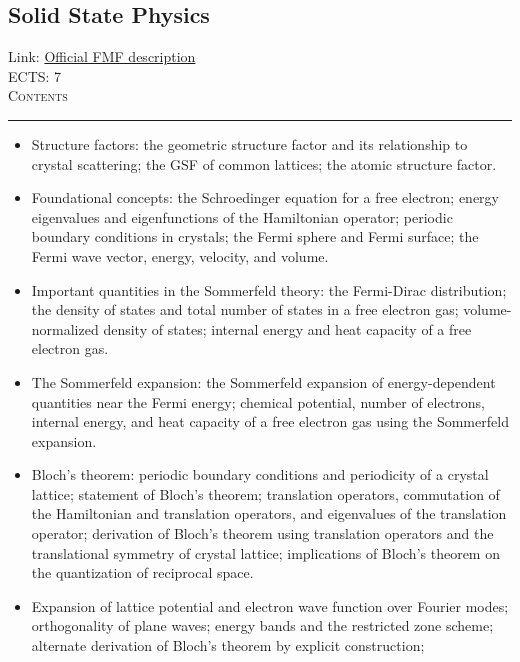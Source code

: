 \documentclass[11pt, a4paper]{article}
\newenvironment{course}[3]{
\subsection{#1}%
Link: \href{#2}{Official FMF description}\\%
ECTS: #3%
\vspace{1ex}
\\
{\large \textsc{Contents}}\\[-0.9ex]%
\rule{\textwidth}{0.5pt}
\vspace{-3ex}
}
{}
\newenvironment{chapter}[1]{
\begin{tcolorbox}[title=#1, breakable]
}
{\end{tcolorbox}}
\begin{document}
\begin{course}{Solid State Physics}{https://www.fmf.uni-lj.si/en/study-physics/programmes/1fiz/2020/7000777/courses/1138/}{7}
\begin{chapter}{Crystal structure}
\begin{itemize}
            \item Structure factors: the geometric structure factor and its relationship to crystal scattering; the GSF of common lattices; the atomic structure factor.

        \end{itemize}
    \end{chapter}

    \begin{chapter}{The Sommerfeld theory of free electrons}
        \begin{itemize}
        
            \item Foundational concepts: the Schroedinger equation for a free electron; energy eigenvalues and eigenfunctions of the Hamiltonian operator; periodic boundary conditions in crystals; the Fermi sphere and Fermi surface; the Fermi wave vector, energy, velocity, and volume.

            \item Important quantities in the Sommerfeld theory: the Fermi-Dirac distribution; the density of states and total number of states in a free electron gas; volume-normalized density of states; internal energy and heat capacity of a free electron gas.

            \item The Sommerfeld expansion: the Sommerfeld expansion of energy-dependent quantities near the Fermi energy; chemical potential, number of electrons, internal energy, and heat capacity of a free electron gas using the Sommerfeld expansion.
        
        \end{itemize}
    \end{chapter}

    \begin{chapter}{Electron states in a periodic potential}
        \begin{itemize}
        
            \item Bloch's theorem: periodic boundary conditions and periodicity of a crystal lattice; statement of Bloch's theorem; translation operators, commutation of the Hamiltonian and translation operators, and eigenvalues of the translation operator;
            derivation of Bloch's theorem using translation operators and the translational symmetry of crystal lattice; implications of Bloch's theorem on the quantization of reciprocal space.

            \item Expansion of lattice potential and electron wave function over Fourier modes; orthogonality of plane waves; energy bands and the restricted zone scheme; alternate derivation of Bloch's theorem by explicit construction;


\end{itemize}
\end{chapter}
\end{course}
\end{document}
